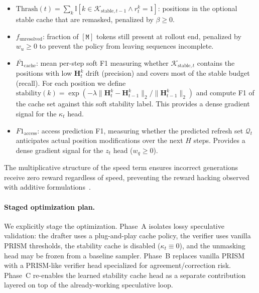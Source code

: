 \documentclass[11pt]{article}
\newcommand{\cK}{\mathcal{K}}
\newcommand{\cQ}{\mathcal{Q}}
\newcommand{\bH}{\mathbf{H}}
\newcommand{\ind}{\mathbb{I}}
\newcommand{\mask}{\ensuremath{\mathtt{[M]}}}
\begin{document}
\begin{itemize}[itemsep=2pt]
    \item $\text{Thrash}(t) = \sum_k \ind[k \in \cK_{\text{stable},t-1} \land r_t^k = 1]$: positions in the optional stable cache that are remasked, penalized by $\beta \geq 0$.
    \item $f_{\text{unresolved}}$: fraction of $\mask$ tokens still present at rollout end, penalized by $w_u \geq 0$ to prevent the policy from leaving sequences incomplete.
    \item $\overline{F1}_{\text{cache}}$: mean per-step soft F1 measuring whether $\cK_{\text{stable},t}$ contains the positions with low $\bH_t^k$ drift (precision) and covers most of the stable budget (recall). For each position we define $\text{stability}(k) = \exp(-\lambda \|\bH_t^k - \bH_{t-1}^k\|_2 / \|\bH_{t-1}^k\|_2)$ and compute F1 of the cache set against this soft stability label. This provides a dense gradient signal for the $\kappa_t$ head.
    \item $F1_{\text{access}}$: access prediction F1, measuring whether the predicted refresh set $\cQ_t$ anticipates actual position modifications over the next $H$ steps. Provides a dense gradient signal for the $z_t$ head ($w_q \geq 0$).
\end{itemize}
The multiplicative structure of the speed term ensures incorrect generations receive zero reward regardless of speed, preventing the reward hacking observed with additive formulations~\cite{jazbec2025learning}.

\paragraph{Staged optimization plan.}
We explicitly stage the optimization. Phase~A isolates lossy speculative validation: the drafter uses a plug-and-play cache policy, the verifier uses vanilla PRISM thresholds, the stability cache is disabled ($\kappa_t \equiv 0$), and the unmasking head may be frozen from a baseline sampler. Phase~B replaces vanilla PRISM with a PRISM-like verifier head specialized for agreement/correction risk. Phase~C re-enables the learned stability cache head as a separate contribution layered on top of the already-working speculative loop.
\end{document}
